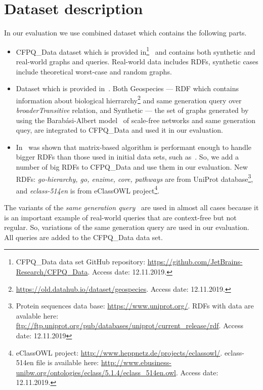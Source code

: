 \section{Dataset description}

In our evaluation we use combined dataset which contains the following parts.
\begin{itemize}
\item CFPQ\_Data dataset which is provided in\footnote{CFPQ\_Data data set GitHub repository: \url{https://github.com/JetBrains-Research/CFPQ_Data}. Access date: 12.11.2019.}~\cite{Mishin:2019:ECP:3327964.3328503} and contains both synthetic and real-world graphs and queries.
Real-world data includes RDFs, synthetic cases include theoretical worst-case and random graphs.
\item Dataset which is provided in~\cite{Kuijpers:2019:ESC:3335783.3335791}. Both Geospecies --- RDF which contains information about biological hierrarchy\footnote{\url{https://old.datahub.io/dataset/geospecies}. Access date: 12.11.2019.} and same generation query over \textit{broaderTransitive} relation, and Synthetic --- the set of graphs generated by using the Barab\'asi-Albert model~\cite{Albert_statisticalmechanics} of scale-free networks and same generation quey, are integrated to CFPQ\_Data and used it in our evaluation.
\item In~\cite{Mishin:2019:ECP:3327964.3328503} was shown that matrix-based algorithm is performant enough to handle bigger RDFs than those used in initial data sets, such as~\cite{RDF}.
So, we add a number of big RDFs to CFPQ\_Data and use them in our evaluation.
New RDFs: \textit{go-hierarchy, go, enzime, core, pathways} are from UniProt database\footnote{Protein sequences data base: \url{https://www.uniprot.org/}. RDFs with data are avalable here: \url{ftp://ftp.uniprot.org/pub/databases/uniprot/current_release/rdf}. Access date: 12.11.2019}, and \textit{eclass-514en} is from eClassOWL project\footnote{eClassOWL project: \url{http://www.heppnetz.de/projects/eclassowl/}. eclass-514en file is available here: \url{http://www.ebusiness-unibw.org/ontologies/eclass/5.1.4/eclass_514en.owl}. Access date: 12.11.2019.}.
\end{itemize}

The variants of the \textit{same generation query}~\cite{FndDB} are used in almost all cases because it is an important example of real-world queries that are context-free but not regular.
So, variations of the same generation query are used in our evaluation.
All queries are added to the CFPQ\_Data data set.

